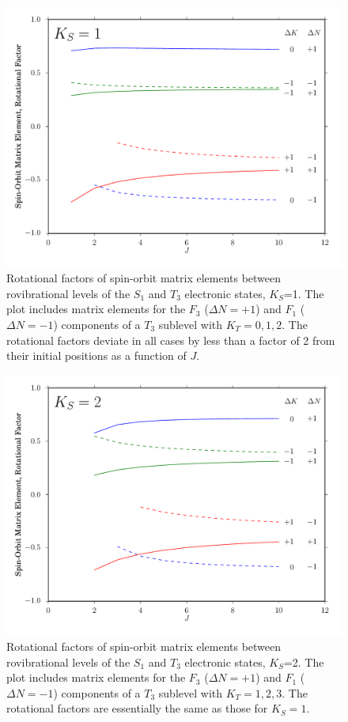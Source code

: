 \documentclass[12pt]{mitthesis}
\begin{document}
\begin{figure}[p]
  \caption{Rotational factors of spin-orbit matrix elements between
    rovibrational levels of the $S_1$ and $T_3$ electronic states,
    $K_S$=1.  The plot includes matrix elements for the $F_3$ ($\Delta
    N = +1$) and $F_1$ ($\Delta N = -1$) components of a $T_3$
    sublevel with $K_T=0,1,2$.  The rotational factors deviate in all
    cases by less than a factor of 2 from their initial positions as a
    function of $J$.}
  \label{fig:rotational-factors-1}
  \centering
  \includegraphics[width=6in]{rotational-factors-k1.pdf}
\end{figure}

\begin{figure}[p]
  \caption{Rotational factors of spin-orbit matrix elements between
    rovibrational levels of the $S_1$ and $T_3$ electronic states,
    $K_S$=2.  The plot includes matrix elements for the $F_3$ ($\Delta
    N = +1$) and $F_1$ ($\Delta N = -1$) components of a $T_3$
    sublevel with $K_T=1,2,3$.  The rotational factors are essentially
    the same as those for $K_S=1$.}
  \label{fig:rotational-factors-2}
  \centering
  \includegraphics[width=6in]{rotational-factors-k2.pdf}
\end{figure}
\end{document}
